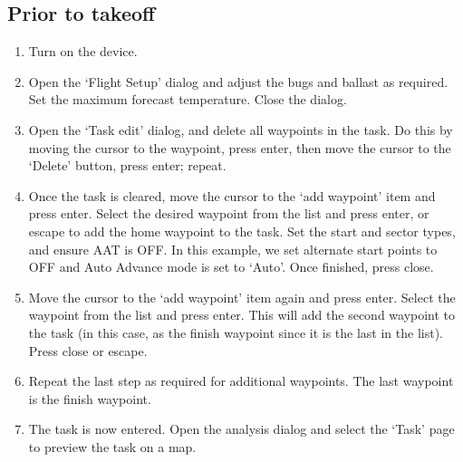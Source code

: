 \documentclass[a4paper,12pt]{refrep}
\begin{document}
\subsection*{Prior to takeoff}
\begin{enumerate}
\item Turn on the device.
\item Open the `Flight Setup' dialog and adjust the bugs and ballast as
required. Set the maximum forecast temperature.  Close the dialog.
\item Open the `Task edit' dialog, and delete all waypoints in the task.  Do this by moving the cursor to the waypoint, press enter, then move the cursor to the `Delete' button, press enter; repeat.
\item Once the task is cleared, move the cursor to the `add waypoint' item and press enter.  Select the desired waypoint from the list and press enter, or escape to add the home waypoint to the task.  Set the start and sector types, and ensure AAT is OFF.  In this example, we set alternate start points to OFF and Auto Advance mode is set to `Auto'.  Once finished, press close.
\item Move the cursor to the `add waypoint' item again and press enter.  Select the waypoint from the list and press enter.  This will add the second waypoint to the task (in this case, as the finish waypoint since it is the last in the list).  Press close or escape.
\item Repeat the last step as required for additional waypoints.  The last waypoint is the finish waypoint.
\item The task is now entered.  Open the analysis dialog and select the `Task' page to preview the task on a map.
\end{enumerate}
\end{document}
